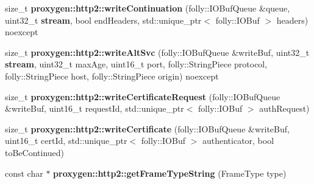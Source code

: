 \begin{DoxyCompactItemize}
\item 
size\+\_\+t {\bf proxygen\+::http2\+::write\+Continuation} (folly\+::\+I\+O\+Buf\+Queue \&queue, uint32\+\_\+t {\bf stream}, bool end\+Headers, std\+::unique\+\_\+ptr$<$ folly\+::\+I\+O\+Buf $>$ headers) noexcept
\item 
size\+\_\+t {\bf proxygen\+::http2\+::write\+Alt\+Svc} (folly\+::\+I\+O\+Buf\+Queue \&write\+Buf, uint32\+\_\+t {\bf stream}, uint32\+\_\+t max\+Age, uint16\+\_\+t port, folly\+::\+String\+Piece protocol, folly\+::\+String\+Piece host, folly\+::\+String\+Piece origin) noexcept
\item 
size\+\_\+t {\bf proxygen\+::http2\+::write\+Certificate\+Request} (folly\+::\+I\+O\+Buf\+Queue \&write\+Buf, uint16\+\_\+t request\+Id, std\+::unique\+\_\+ptr$<$ folly\+::\+I\+O\+Buf $>$ auth\+Request)
\item 
size\+\_\+t {\bf proxygen\+::http2\+::write\+Certificate} (folly\+::\+I\+O\+Buf\+Queue \&write\+Buf, uint16\+\_\+t cert\+Id, std\+::unique\+\_\+ptr$<$ folly\+::\+I\+O\+Buf $>$ authenticator, bool to\+Be\+Continued)
\item 
const char $\ast$ {\bf proxygen\+::http2\+::get\+Frame\+Type\+String} (Frame\+Type type)
\end{DoxyCompactItemize}
